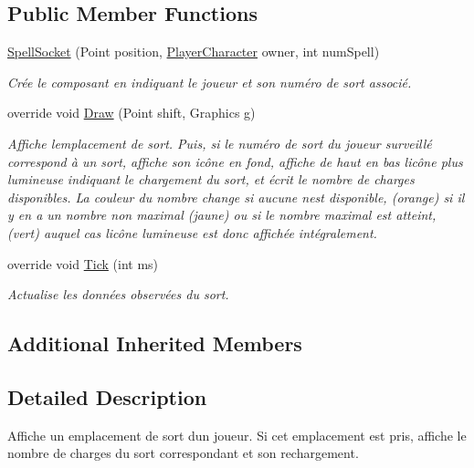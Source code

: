 \subsection*{Public Member Functions}
\begin{DoxyCompactItemize}
\item 
\hyperlink{class_tentacle_slicers_1_1hud_1_1_spell_socket_ac08ef806247c947eeb28aba3b4f878de}{Spell\+Socket} (Point position, \hyperlink{class_tentacle_slicers_1_1actors_1_1_player_character}{Player\+Character} owner, int num\+Spell)
\begin{DoxyCompactList}\small\item\em Crée le composant en indiquant le joueur et son numéro de sort associé. \end{DoxyCompactList}\item 
override void \hyperlink{class_tentacle_slicers_1_1hud_1_1_spell_socket_a145d3c8a9ba0305f15d41f768493ecef}{Draw} (Point shift, Graphics g)
\begin{DoxyCompactList}\small\item\em Affiche l\textquotesingle{}emplacement de sort. Puis, si le numéro de sort du joueur surveillé correspond à un sort, affiche son icône en fond, affiche de haut en bas l\textquotesingle{}icône plus lumineuse indiquant le chargement du sort, et écrit le nombre de charges disponibles. La couleur du nombre change si aucune n\textquotesingle{}est disponible, (orange) si il y en a un nombre non maximal (jaune) ou si le nombre maximal est atteint, (vert) auquel cas l\textquotesingle{}icône lumineuse est donc affichée intégralement. \end{DoxyCompactList}\item 
override void \hyperlink{class_tentacle_slicers_1_1hud_1_1_spell_socket_a0b15896dbd161ba9abea4616a18ddd69}{Tick} (int ms)
\begin{DoxyCompactList}\small\item\em Actualise les données observées du sort. \end{DoxyCompactList}\end{DoxyCompactItemize}
\subsection*{Additional Inherited Members}


\subsection{Detailed Description}
Affiche un emplacement de sort d\textquotesingle{}un joueur. Si cet emplacement est pris, affiche le nombre de charges du sort correspondant et son rechargement. 



